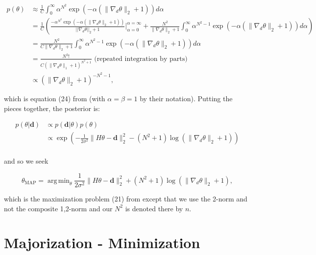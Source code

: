 \documentclass[paper=a4, fontsize=11pt]{scrartcl} %
\DeclareMathOperator*{\argmin}{arg\,min}
\numberwithin{equation}{section} %
\numberwithin{figure}{section} %
\numberwithin{table}{section} %
\newcommand{\data}{\mathbf{d}}
\newcommand{\param}{\theta}
\newcommand{\grad}{\nabla_{d} }
\begin{document}
\begin{align*}
  p (\param) &\approx \frac{1}{C} \int_{0}^{\infty} \alpha^{N^2 } \exp( -\alpha (\|\grad\param\|_2 + 1)) d\alpha \\
  &= \frac{1}{C} \left (
  \frac{-\alpha^{N^2} \exp(-\alpha (\|\grad\param\|_2 + 1))}{||\grad\param||_2 + 1} \bigg |_{\alpha=0}^{\alpha=\infty}
  +\frac{N^2}{\|\grad\param\|_2 + 1}\int_{0}^{\infty} \alpha^{N^2-1} \exp( -\alpha (\|\grad\param\|_2 + 1)) d\alpha \right ) \\
  &= \frac{N^2}{C\|\grad\param\|_2 + 1}\int_{0}^{\infty} \alpha^{N^2-1} \exp( -\alpha (\|\grad\param\|_2 + 1)) d\alpha \\
  &= \frac{ N^2!}{ C(\|\grad\param\|_1 + 1)^{N^2+1}} \text{ (repeated integration by parts)}\\
  &\propto (\|\grad\param\|_2 + 1)^{-N^2-1},
\end{align*}

which is equation (24) from \cite{oliveira2009adaptive} (with $\alpha
= \beta = 1$ by their notation). Putting the pieces together, the
posterior is:

\begin{align*}
  p(\param | \data ) &\propto p( \data | \param ) p(\param ) \\
  &\propto \exp \left ( -\frac{1}{2\sigma^2} \|H\param - \data\|_2^2 - (N^2 + 1) \log (\|\grad\param\|_2 + 1) \right ) \\
\end{align*}
 
and so we seek

\begin{equation}\label{eq:problem}
\param_{\text{MAP}} = \argmin_{\param} \frac{1}{2\sigma^2} \|H\param - \data \|_2^2 + (N^2 + 1) \log (\|\grad\param\|_2 + 1),
\end{equation}

which is the maximization problem (21) from \cite{green2015bayesian}
except that we use the 2-norm and not the composite 1,2-norm and our
$N^2$ is denoted there by $n$.

\section{Majorization - Minimization}\label{subsec:MM}
\end{document}
